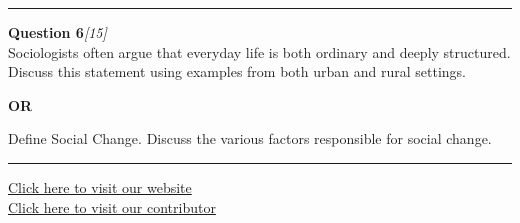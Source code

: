 \documentclass[11pt,a4paper]{article}
\newcommand{\pts}[1]{\hfill   \textit{[#1]}}
\begin{document}
\medskip\rule{\linewidth}{0.2pt}\medskip




\noindent   \textbf{Question 6}\pts{15} \\
Sociologists often argue that everyday life is both ordinary and deeply structured. Discuss this statement using examples from both urban and rural settings.


\begin{center}   \textbf{OR}\end{center}

Define Social Change. Discuss the various factors responsible for social change.

\vfill\rule{\linewidth}{0.4pt}

\begin{center}\small
\href{https://bhu-exam.vercel.app/}{Click here to visit our website}\\[4pt]
\href{https://me-aryan.vercel.app/}{Click here to visit our contributor}
\end{center}
\end{document}
